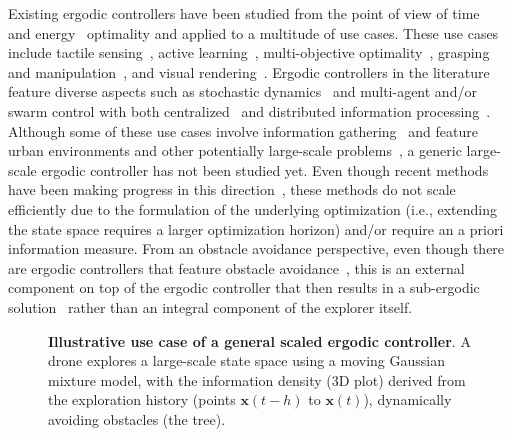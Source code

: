 \documentclass[letterpaper,10pt,conference,twoside]{IEEEtran}
\theoremstyle{definition}
\begin{document}
Existing ergodic controllers have been studied from the point of view of time~\cite{dong2023time} and energy~\cite{seewald2024energy,naveed2024eclares} optimality and applied to a multitude of use cases. These use cases include tactile sensing~\cite{abraham2017ergodic}, active learning~\cite{abraham2021ergodic}, multi-objective optimality~\cite{ren2023pareto,srinivasan2023multi}, grasping and manipulation~\cite{shetty2022ergodic,bilaloglu2023whole}, and visual rendering~\cite{low2022drozbot,prabhakar2020autonomous}. Ergodic controllers in the literature feature diverse aspects such as stochastic dynamics~\cite{torre2016ergodic,ayvali2017ergodic} and multi-agent and/or swarm control with both centralized~\cite{seewald2024energy,rao2024learning} and distributed information processing~\cite{prabhakar2020ergodic,coffin2022multi}. Although some of these use cases involve information gathering~\cite{dressel2018optimality} and feature urban environments and other potentially large-scale problems~\cite{prabhakar2020ergodic,rao2023multi}, a generic large-scale ergodic controller has not been studied yet. Even though recent methods have been making progress in this direction~\cite{whittemeyer2023bi,seewald2024energy,naveed2024eclares,dong2023time}, these methods do not scale efficiently due to the formulation of the underlying optimization (i.e., extending the state space requires a larger optimization horizon) and/or require an a priori information measure. From an obstacle avoidance perspective, even though there are ergodic controllers that feature obstacle avoidance~\cite{lerch2023safety}, this is an external component on top of the ergodic controller that then results in a sub-ergodic solution~\cite{dong2023time} rather than an integral component of the explorer itself.


\begin{figure}
  \centering
  
  \caption{\textbf{Illustrative use case of a general scaled ergodic controller}. A drone explores a large-scale state space using a moving Gaussian mixture model, with the information density (3D plot) derived from the exploration history (points $\mathbf{x}(t-h)$ to $\mathbf{x}(t)$), dynamically avoiding obstacles (the tree).}
\end{figure}
\end{document}
